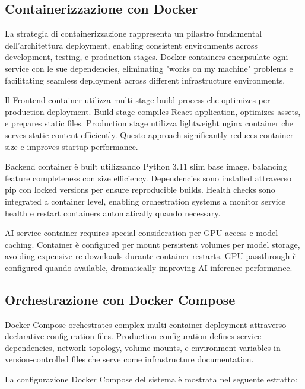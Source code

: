 \documentclass[12pt,a4paper]{article}
\begin{document}
\subsection{Containerizzazione con Docker}

La strategia di containerizzazione rappresenta un pilastro fundamental dell'architettura deployment, enabling consistent environments across development, testing, e production stages. Docker containers encapsulate ogni service con le sue dependencies, eliminating "works on my machine" problems e facilitating seamless deployment across different infrastructure environments.

Il Frontend container utilizza multi-stage build process che optimizes per production deployment. Build stage compiles React application, optimizes assets, e prepares static files. Production stage utilizza lightweight nginx container che serves static content efficiently. Questo approach significantly reduces container size e improves startup performance.

Backend container è built utilizzando Python 3.11 slim base image, balancing feature completeness con size efficiency. Dependencies sono installed attraverso pip con locked versions per ensure reproducible builds. Health checks sono integrated a container level, enabling orchestration systems a monitor service health e restart containers automatically quando necessary.

AI service container requires special consideration per GPU access e model caching. Container è configured per mount persistent volumes per model storage, avoiding expensive re-downloads durante container restarts. GPU passthrough è configured quando available, dramatically improving AI inference performance.

\subsection{Orchestrazione con Docker Compose}

Docker Compose orchestrates complex multi-container deployment attraverso declarative configuration files. Production configuration defines service dependencies, network topology, volume mounts, e environment variables in version-controlled files che serve come infrastructure documentation.

La configurazione Docker Compose del sistema è mostrata nel seguente estratto:
\end{document}
